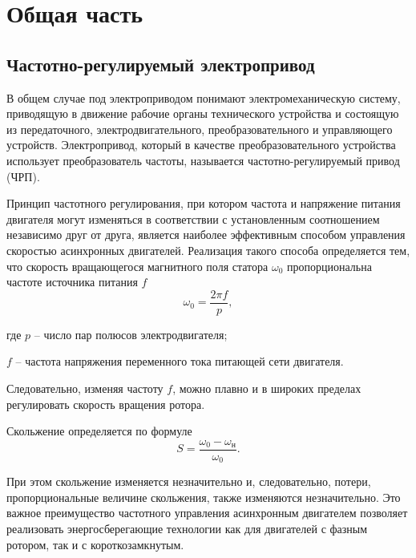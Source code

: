 \section{Общая часть}
    \subsection{Частотно-регулируемый электропривод}
        В общем случае под электроприводом понимают электромеханическую
        систему, приводящую в движение рабочие органы технического устройства и
        состоящую из передаточного, электродвигательного, преобразовательного и
        управляющего устройств. Электропривод, который в качестве
        преобразовательного устройства использует преобразователь частоты,
        называется частотно-регулируемый привод (ЧРП). 

        Принцип частотного регулирования, при котором частота и напряжение
        питания двигателя могут изменяться в соответствии с установленным
        соотношением независимо друг от друга, является наиболее эффективным
        способом управления скоростью асинхронных двигателей. Реализация такого
        способа определяется тем, что скорость вращающегося магнитного поля
        статора $\omega_0$  пропорциональна частоте источника питания $f$
        \begin{equation}
            \label{eq:w0}
            \omega_0 = \frac{2\pi f}{p},
        \end{equation}

        где $p$ -- число пар полюсов электродвигателя;

        $f$ -- частота напряжения переменного тока питающей сети двигателя.
        
        Следовательно, изменяя частоту $f$,
        можно плавно и в широких пределах регулировать скорость вращения
        ротора. 

        Скольжение определяется по формуле
        \begin{equation}
            \label{eq:slip}
            S = \frac{\omega_0 - \omega_\text{н}}{\omega_0}.
        \end{equation}
        
        При этом скольжение изменяется незначительно и, следовательно, потери,
        пропорциональные величине скольжения, также изменяются незначительно.
        Это важное преимущество частотного управления асинхронным двигателем
        позволяет реализовать энергосберегающие технологии как для двигателей с
        фазным ротором, так и с короткозамкнутым.

